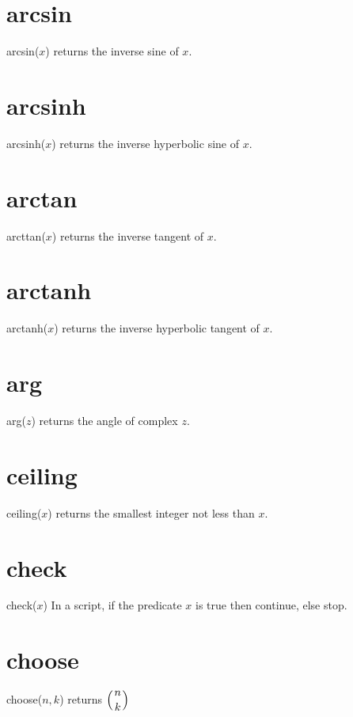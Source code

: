 \documentclass[12pt,openany]{report}
\begin{document}
\section*{arcsin}
arcsin($x$) returns the inverse sine of $x$.

\section*{arcsinh}
arcsinh($x$) returns the inverse hyperbolic sine of $x$.

\section*{arctan}
arcttan($x$) returns the inverse tangent of $x$.

\section*{arctanh}
arctanh($x$) returns the inverse hyperbolic tangent of $x$.

\section*{arg}
arg($z$) returns the angle of complex $z$.

\section*{ceiling}
ceiling($x$) returns the smallest integer not less than $x$.

\section*{check}
check($x$) In a script, if the predicate $x$ is true then continue, else stop.

\section*{choose}
choose($n,k$) returns $\displaystyle\left({n \atop k}\right)$
\end{document}
